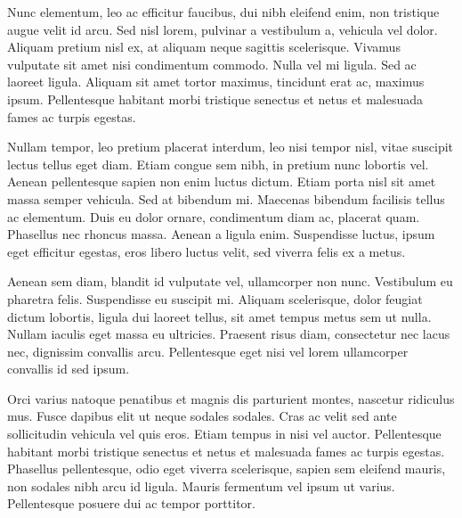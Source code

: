 \documentclass[a4paper,oneside,12pt]{report}
\begin{document}
Nunc elementum, leo ac efficitur faucibus, dui nibh eleifend enim, non tristique augue velit id arcu. Sed nisl lorem, pulvinar a vestibulum a, vehicula vel dolor. Aliquam pretium nisl ex, at aliquam neque sagittis scelerisque. Vivamus vulputate sit amet nisi condimentum commodo. Nulla vel mi ligula. Sed ac laoreet ligula. Aliquam sit amet tortor maximus, tincidunt erat ac, maximus ipsum. Pellentesque habitant morbi tristique senectus et netus et malesuada fames ac turpis egestas.

Nullam tempor, leo pretium placerat interdum, leo nisi tempor nisl, vitae suscipit lectus tellus eget diam. Etiam congue sem nibh, in pretium nunc lobortis vel. Aenean pellentesque sapien non enim luctus dictum. Etiam porta nisl sit amet massa semper vehicula. Sed at bibendum mi. Maecenas bibendum facilisis tellus ac elementum. Duis eu dolor ornare, condimentum diam ac, placerat quam. Phasellus nec rhoncus massa. Aenean a ligula enim. Suspendisse luctus, ipsum eget efficitur egestas, eros libero luctus velit, sed viverra felis ex a metus.

Aenean sem diam, blandit id vulputate vel, ullamcorper non nunc. Vestibulum eu pharetra felis. Suspendisse eu suscipit mi. Aliquam scelerisque, dolor feugiat dictum lobortis, ligula dui laoreet tellus, sit amet tempus metus sem ut nulla. Nullam iaculis eget massa eu ultricies. Praesent risus diam, consectetur nec lacus nec, dignissim convallis arcu. Pellentesque eget nisi vel lorem ullamcorper convallis id sed ipsum.

Orci varius natoque penatibus et magnis dis parturient montes, nascetur ridiculus mus. Fusce dapibus elit ut neque sodales sodales. Cras ac velit sed ante sollicitudin vehicula vel quis eros. Etiam tempus in nisi vel auctor. Pellentesque habitant morbi tristique senectus et netus et malesuada fames ac turpis egestas. Phasellus pellentesque, odio eget viverra scelerisque, sapien sem eleifend mauris, non sodales nibh arcu id ligula. Mauris fermentum vel ipsum ut varius. Pellentesque posuere dui ac tempor porttitor.





\chapter*{} %
\setcounter{page}{5}





\listoffigures
\openright
\end{document}
